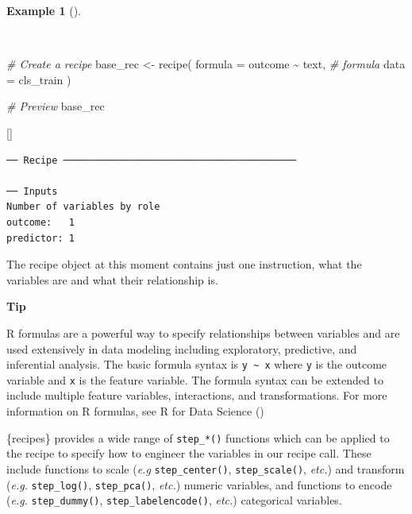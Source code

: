 \documentclass[
  letterpaper,
  krantz1]{latex/krantz-mod}
\newenvironment{Shaded}{\begin{snugshade}}{\end{snugshade}}
\newcommand{\AttributeTok}[1]{\textcolor[rgb]{0.00,0.00,0.00}{#1}}
\newcommand{\CommentTok}[1]{\textcolor[rgb]{0.00,0.00,0.00}{\textit{#1}}}
\newcommand{\FunctionTok}[1]{\textcolor[rgb]{0.00,0.00,0.00}{#1}}
\newcommand{\NormalTok}[1]{\textcolor[rgb]{0.00,0.00,0.00}{#1}}
\newcommand{\OtherTok}[1]{\textcolor[rgb]{0.00,0.00,0.00}{#1}}
\newcommand{\SpecialCharTok}[1]{\textcolor[rgb]{0.00,0.00,0.00}{#1}}
\newcommand{\cindex}[1]{%
  \StrSubstitute{#1}{_}{\_}[\temp]%
  \index{\temp}%
}
\theoremstyle{definition}
\theoremstyle{definition}
\newtheorem{example}{Example}[chapter]
\theoremstyle{remark}
\begin{document}
\begin{example}[]\protect\hypertarget{exm-predict-class-recipe}{}\label{exm-predict-class-recipe}

~

\begin{Shaded}
\begin{Highlighting}[numbers=left,,]
\CommentTok{\# Create a recipe}
\NormalTok{base\_rec }\OtherTok{\textless{}{-}}
  \FunctionTok{recipe}\NormalTok{(}
    \AttributeTok{formula =}\NormalTok{ outcome }\SpecialCharTok{\textasciitilde{}}\NormalTok{ text, }\CommentTok{\# formula}
    \AttributeTok{data =}\NormalTok{ cls\_train}
\NormalTok{    )}

\CommentTok{\# Preview}
\NormalTok{base\_rec}
\end{Highlighting}
\end{Shaded}

 \cindex{recipe()}

\begin{verbatim}
── Recipe ─────────────────────────────────────────

── Inputs
Number of variables by role
outcome:   1
predictor: 1
\end{verbatim}

\end{example}

The recipe object at this moment contains just one instruction, what the
variables are and what their relationship is.

\begin{tcolorbox}[enhanced jigsaw, toprule=.15mm, breakable, colback=white, arc=.35mm, left=2mm, colframe=quarto-callout-color-frame, opacityback=0, bottomrule=.15mm, rightrule=.15mm, leftrule=.75mm]

\textbf{ Tip}

R formulas are a powerful way to specify relationships between variables
and are used extensively in data modeling including exploratory,
predictive, and inferential analysis. The basic formula syntax is
\texttt{y\ \textasciitilde{}\ x} where \texttt{y} is the outcome
variable and \texttt{x} is the feature variable. The formula syntax can
be extended to include multiple feature variables, interactions, and
transformations. For more information on R formulas, see R for Data
Science ()

\end{tcolorbox}

\{recipes\} provides a wide range of \texttt{step\_*()} functions which
can be applied to the recipe to specify how to engineer the variables in
our recipe call. These include functions to scale (\emph{e.g}
\texttt{step\_center()}, \texttt{step\_scale()}, \emph{etc.}) and
transform (\emph{e.g.} \texttt{step\_log()}, \texttt{step\_pca()},
\emph{etc.}) numeric variables, and functions to encode (\emph{e.g.}
\texttt{step\_dummy()}, \texttt{step\_labelencode()}, \emph{etc.})
categorical variables.
\end{document}
